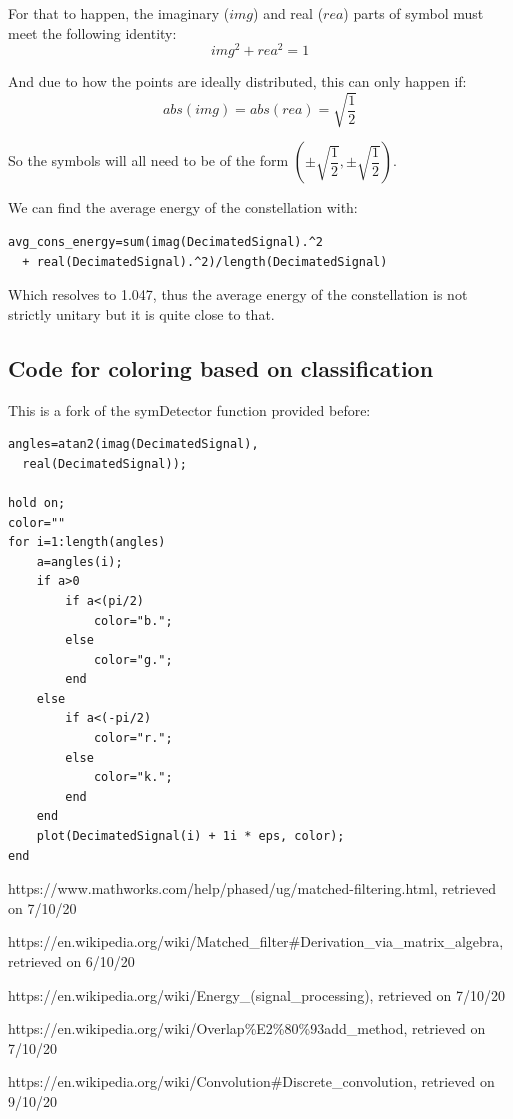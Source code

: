 \documentclass[conference,9pt]{IEEEtran}
\begin{document}
For that to happen, the imaginary ($img$) and real ($rea$) parts of symbol must meet the following identity:
$$img^2+rea^2=1$$

And due to how the points are ideally distributed, this can only happen  if:
$$abs(img)=abs(rea)=\sqrt{\dfrac{1}{2}}$$

So the symbols will all need to be of the form $(\pm\sqrt{\dfrac{1}{2}}, \pm\sqrt{\dfrac{1}{2}})$.

We can find the average energy of the constellation with:
\begin{verbatim}
avg_cons_energy=sum(imag(DecimatedSignal).^2
  + real(DecimatedSignal).^2)/length(DecimatedSignal)
\end{verbatim}

Which resolves to 1.047, thus the average energy of the constellation is not strictly unitary but it is quite close to that.

\subsection{Code for coloring based on classification}
This is a fork of the symDetector function provided before:
\begin{verbatim}
angles=atan2(imag(DecimatedSignal),
  real(DecimatedSignal));

hold on;
color=""
for i=1:length(angles)
    a=angles(i);
    if a>0
        if a<(pi/2)
            color="b.";
        else
            color="g.";
        end
    else
        if a<(-pi/2)
            color="r.";
        else
            color="k.";
        end
    end
    plot(DecimatedSignal(i) + 1i * eps, color);
end
\end{verbatim}


\begin{thebibliography}{1}

  https://www.mathworks.com/help/phased/ug/matched-filtering.html,
  retrieved on 7/10/20

  https://en.wikipedia.org/wiki/Matched\_filter\#Derivation\_via\_matrix\_algebra,
  retrieved on 6/10/20

  https://en.wikipedia.org/wiki/Energy\_(signal\_processing),
  retrieved on 7/10/20

  https://en.wikipedia.org/wiki/Overlap\%E2\%80\%93add\_method,
  retrieved on 7/10/20

  https://en.wikipedia.org/wiki/Convolution\#Discrete\_convolution, 
  retrieved on 9/10/20
\end{thebibliography}

\end{document}
